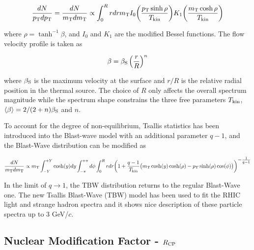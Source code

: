 \begin{equation}
\frac{dN}{p_{\rm T}dp_{\rm T}} = \frac{dN}{m_{\rm T}dm_{\rm T}} \propto \int_0^R rdr m_{\rm T} I_0\bigg(\frac{p_{\rm T}\sinh\rho}{T_{\rm kin}}\bigg) K_1\bigg(\frac{m_{\rm T}\cosh\rho}{T_{\rm kin}}\bigg)
\end{equation}

where $\rho = \tanh^{-1}\beta$, and $I_0$ and $K_1$ are the modified Bessel functions. The flow velocity profile is taken as

\begin{equation}
\beta = \beta_{\rm S}\left(\frac{r}{R}\right)^{n}
\end{equation}

where $\beta_{\rm S}$ is the maximum velocity at the surface and $r/R$ is the relative radial position in the thermal source. The choice of $R$ only affects the overall spectrum magnitude while the spectrum shape constrains the three free parameters $T_{\rm kin}$, $\langle\beta\rangle=2/(2+n)\beta_{\rm S}$ and $n$.


To account for the degree of non-equilibrium, Tsallis statistics has been introduced into the Blast-wave model with an additional parameter $q-1$, and the Blast-Wave distribution can be modified as

\begin{equation}
\frac{dN}{m_{\rm T}dm_{\rm T}} \propto m_{\rm T}\int_{-Y}^{+Y}\cosh(y)dy \int_{-\pi}^{+\pi} d\phi \int_0^R rdr \bigg(1+\frac{q-1}{T_{\rm kin}}\big(m_{\rm T}\cosh(y)\cosh(\rho)-p_{\rm T}\sinh(\rho)\cos(\phi)\big)\bigg)^{\textstyle -\frac{1}{q-1}}
\end{equation}

In the limit of $q\rightarrow 1$, the TBW distribution returns to the regular Blast-Wave one. The new Tsallis Blast-Wave (TBW) model has been used to fit the RHIC light and strange hadron spectra and it shows nice description of these particle spectra up to 3 GeV/$c$.



\subsection{\label{result:RCP}Nuclear Modification Factor - $R_{\rm CP}$}

